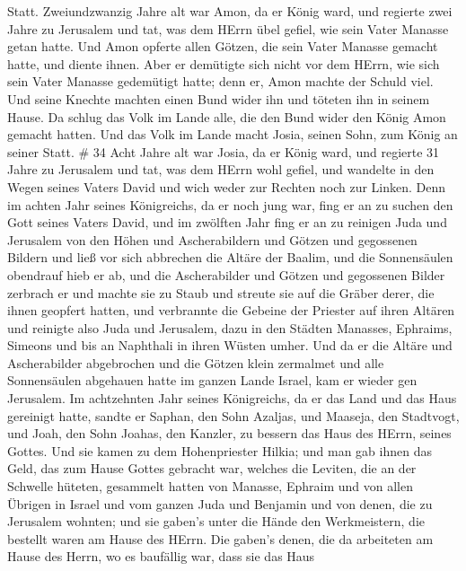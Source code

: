 Statt.  Zweiundzwanzig Jahre alt war Amon, da er König
ward, und regierte zwei Jahre zu Jerusalem  und tat, was
dem HErrn übel gefiel, wie sein Vater Manasse getan hatte. Und Amon
opferte allen Götzen, die sein Vater Manasse gemacht hatte, und diente
ihnen.  Aber er demütigte sich nicht vor dem HErrn, wie
sich sein Vater Manasse gedemütigt hatte; denn er, Amon machte der
Schuld viel.  Und seine Knechte machten einen Bund wider
ihn und töteten ihn in seinem Hause.  Da schlug das Volk im
Lande alle, die den Bund wider den König Amon gemacht hatten. Und das
Volk im Lande macht Josia, seinen Sohn, zum König an seiner Statt. \# 34
 Acht Jahre alt war Josia, da er König ward, und regierte 31
Jahre zu Jerusalem  und tat, was dem HErrn wohl gefiel, und
wandelte in den Wegen seines Vaters David und wich weder zur Rechten
noch zur Linken.  Denn im achten Jahr seines Königreichs, da
er noch jung war, fing er an zu suchen den Gott seines Vaters David, und
im zwölften Jahr fing er an zu reinigen Juda und Jerusalem von den Höhen
und Ascherabildern und Götzen und gegossenen Bildern  und
ließ vor sich abbrechen die Altäre der Baalim, und die Sonnensäulen
obendrauf hieb er ab, und die Ascherabilder und Götzen und gegossenen
Bilder zerbrach er und machte sie zu Staub und streute sie auf die
Gräber derer, die ihnen geopfert hatten,  und verbrannte die
Gebeine der Priester auf ihren Altären und reinigte also Juda und
Jerusalem,  dazu in den Städten Manasses, Ephraims, Simeons
und bis an Naphthali in ihren Wüsten umher.  Und da er die
Altäre und Ascherabilder abgebrochen und die Götzen klein zermalmet und
alle Sonnensäulen abgehauen hatte im ganzen Lande Israel, kam er wieder
gen Jerusalem.  Im achtzehnten Jahr seines Königreichs, da
er das Land und das Haus gereinigt hatte, sandte er Saphan, den Sohn
Azaljas, und Maaseja, den Stadtvogt, und Joah, den Sohn Joahas, den
Kanzler, zu bessern das Haus des HErrn, seines Gottes.  Und
sie kamen zu dem Hohenpriester Hilkia; und man gab ihnen das Geld, das
zum Hause Gottes gebracht war, welches die Leviten, die an der Schwelle
hüteten, gesammelt hatten von Manasse, Ephraim und von allen Übrigen in
Israel und vom ganzen Juda und Benjamin und von denen, die zu Jerusalem
wohnten;  und sie gaben's unter die Hände den Werkmeistern,
die bestellt waren am Hause des HErrn. Die gaben's denen, die da
arbeiteten am Hause des Herrn, wo es baufällig war, dass sie das Haus
